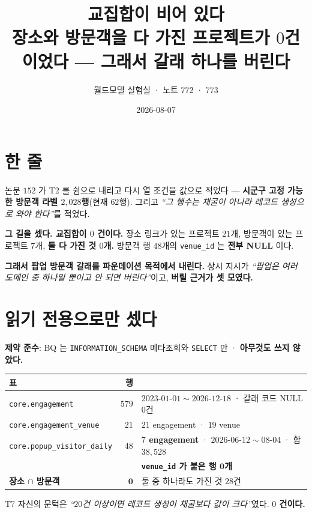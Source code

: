 \documentclass[10pt,a4paper]{article}
\title{\bfseries 교집합이 비어 있다\\[2pt]
\large 장소와 방문객을 다 가진 프로젝트가 $0$건이었다 --- 그래서 갈래 하나를 버린다}
\author{월드모델 실험실 · 노트 772 · 773}
\date{2026-08-07}
\begin{document}
\maketitle

\section{한 줄}

논문 $152$ 가 T2 를 쉼으로 내리고 다시 열 조건을 값으로 적었다 --- \textbf{시군구 고정
가능한 방문객 라벨 $2{,}028$행}(현재 $62$행). 그리고 \emph{``그 행수는 채굴이 아니라
레코드 생성으로 와야 한다''}를 적었다.

\textbf{그 길을 셌다. 교집합이 $0$ 건이다.} 장소 링크가 있는 프로젝트 $21$개, 방문객이
있는 프로젝트 $7$개, \textbf{둘 다 가진 것 $0$개.} 방문객 행 $48$개의
\texttt{venue\_id} 는 \textbf{전부 NULL} 이다.

\textbf{그래서 팝업 방문객 갈래를 파운데이션 목적에서 내린다.} 상시 지시가
\emph{``팝업은 여러 도메인 중 하나일 뿐이고 안 되면 버린다''}이고, \textbf{버릴 근거가
셋 모였다.}

\section{읽기 전용으로만 셌다}

\textbf{제약 준수}: BQ 는 \texttt{INFORMATION\_SCHEMA} 메타조회와 \texttt{SELECT} 만 ·
\textbf{아무것도 쓰지 않았다.}

\begin{center}
\begin{tabular}{lrl}
\toprule
표 & 행 & \\
\midrule
\texttt{core.engagement} & $579$ & $2023$-$01$-$01 \sim 2026$-$12$-$18$ · 갈래 코드 NULL $0$건 \\
\texttt{core.engagement\_venue} & $21$ & $21$ engagement · $19$ venue \\
\texttt{core.popup\_visitor\_daily} & $48$ & \textbf{$7$ engagement} · $2026$-$06$-$12 \sim 08$-$04$ · 합 $38{,}528$ \\
& & \textbf{\texttt{venue\_id} 가 붙은 행 $\mathbf{0}$개} \\
\midrule
\textbf{장소 $\cap$ 방문객} & $\mathbf{0}$ & 둘 중 하나라도 가진 것 $28$건 \\
\bottomrule
\end{tabular}
\end{center}

T7 자신의 문턱은 \emph{``$20$건 이상이면 레코드 생성이 채굴보다 값이 크다''}였다.
\textbf{$0$ 건이다.}
\end{document}
